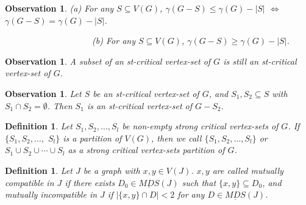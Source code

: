 \documentclass[a4paper,11pt]{article}
\numberwithin{equation}{section}
\newtheorem{defn}[thm]{Definition}
\newtheorem{obs}[thm]{Observation}
\begin{document}
\begin{obs}\label{GS2}
\emph{(a)} For any $S\subseteq V(G)$, $\gamma(G-S)\leq\gamma(G)-|S|$ $\Leftrightarrow$ $\gamma(G-S)=\gamma(G)-|S|$.

~~~~~~~~~~~~~~~~~~~~\emph{(b)} For any $S\subseteq V(G)$,  $\gamma(G-S)\geq\gamma(G)-|S|$.
\end{obs}

\begin{obs}\label{cc-s}\emph{\cite{Zhao}}
A subset of an st-critical vertex-set of $G$ is still an st-critical vertex-set of $G$.
\end{obs}

\begin{obs}\label{S1S2}
Let $S$ be an st-critical vertex-set of $G$, and $S_1,S_2\subseteq S$ with $S_1\cap S_2=\emptyset$. Then $S_1$ is an st-critical vertex-set of $G-S_2$.
\end{obs}


\begin{defn}
\emph{Let $S_1,S_2,\ldots,S_l$ be non-empty strong critical vertex-sets of $G$. If} $\{S_1,S_2, \ldots,$ $S_l\}$ \emph{is a partition of $V(G)$, then we call $\{S_1,S_2,\ldots,S_l\}$ or ${S_1\cup S_2\cup\cdots\cup S_l}$  as a} \emph{strong critical vertex-sets partition} \emph{of $G$}.
\end{defn}



\begin{defn}
\emph{Let $J$ be a graph with $x,y\in V(J)$. $x,y$ are called} mutually compatible \emph{in $J$ if there exists $D_0\in \underline{MDS}(J)$ such that $\{x,y\}\subseteq D_0$, and} mutually incompatible \emph{in $J$} \emph{if $|\{x,y\}\cap D|<2$ for any $D\in \underline{MDS}(J)$.}
\end{defn}
\end{document}
